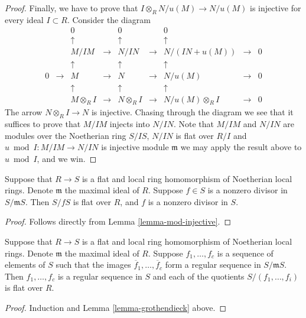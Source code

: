 \begin{proof}
\medskip\noindent
Finally, we have to prove that $I \otimes_R N/u(M) \to N/u(M)$
is injective for every ideal $I \subset R$. Consider the diagram
$$
\begin{matrix}
&
&
0
&
&
0
&
&
0
&
&
\\
&
&
\uparrow
&
&
\uparrow
&
&
\uparrow
&
&
\\
&
&
M/IM
&
\to
&
N/IN
&
\to
&
N/(IN + u(M))
&
\to
&
0
\\
&
&
\uparrow
&
&
\uparrow
&
&
\uparrow
&
&
\\
0
&
\to
&
M
&
\to
&
N
&
\to
&
N/u(M)
&
\to
&
0
\\
&
&
\uparrow
&
&
\uparrow
&
&
\uparrow
&
&
\\
&
&
M \otimes_R I
&
\to
&
N \otimes_R I
&
\to
&
N/u(M)\otimes_R I
&
\to
&
0
\end{matrix}
$$
The arrow $N\otimes_R I \to N$ is injective.
Chasing through the diagram we see
that it suffices to prove that
$M/IM$ injects into $N/IN$.
Note that $M/IM$ and $N/IN$ are modules
over the Noetherian ring $S/IS$,
$N/IN$ is flat over $R/I$ and
$u \bmod I : M/IM \to N/IN$ is injective
module $\mathfrak m$ we may apply
the result above to $u \bmod I$, and we win.
\end{proof}

\begin{lemma}
\label{lemma-grothendieck}
Suppose that $R \to S$ is a flat and local ring homomorphism of Noetherian
local rings. Denote $\mathfrak m$ the maximal ideal of $R$.
Suppose $f \in S$ is a nonzero divisor in $S/{\mathfrak m}S$.
Then $S/fS$ is flat over $R$, and $f$ is a nonzero divisor in $S$.
\end{lemma}

\begin{proof}
Follows directly from Lemma \ref{lemma-mod-injective}.
\end{proof}

\begin{lemma}
\label{lemma-grothendieck-regular-sequence}
Suppose that $R \to S$ is a flat and local ring homomorphism of Noetherian
local rings. Denote $\mathfrak m$ the maximal ideal of $R$.
Suppose $f_1, \ldots, f_c$ is a sequence of elements of
$S$ such that the images $\overline{f}_1, \ldots, \overline{f}_c$
form a regular sequence in $S/{\mathfrak m}S$.
Then $f_1, \ldots, f_c$ is a regular sequence in $S$ and each
of the quotients $S/(f_1, \ldots, f_i)$ is flat over $R$.
\end{lemma}

\begin{proof}
Induction and Lemma \ref{lemma-grothendieck} above.
\end{proof}

